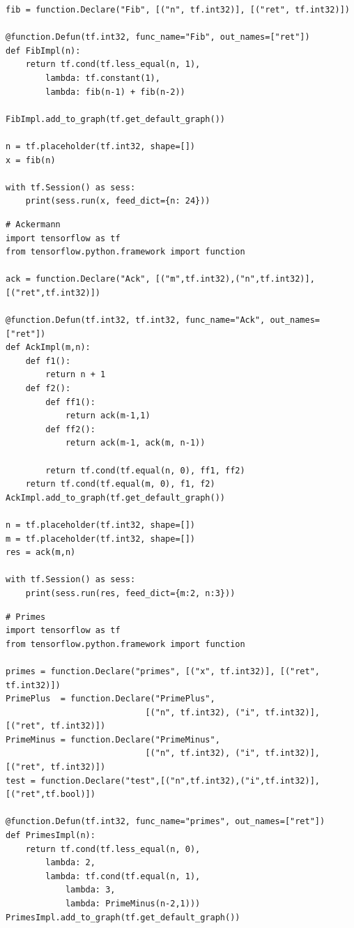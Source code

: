 \documentclass[ack,preface]{dithesis}
\begin{document}
\begin{appendix}
\begin{lstlisting}
fib = function.Declare("Fib", [("n", tf.int32)], [("ret", tf.int32)])

@function.Defun(tf.int32, func_name="Fib", out_names=["ret"])
def FibImpl(n):
	return tf.cond(tf.less_equal(n, 1),
		lambda: tf.constant(1),
		lambda: fib(n-1) + fib(n-2))

FibImpl.add_to_graph(tf.get_default_graph())

n = tf.placeholder(tf.int32, shape=[])
x = fib(n)

with tf.Session() as sess:
	print(sess.run(x, feed_dict={n: 24}))

\end{lstlisting}

\begin{lstlisting}
# Ackermann
import tensorflow as tf
from tensorflow.python.framework import function

ack = function.Declare("Ack", [("m",tf.int32),("n",tf.int32)],[("ret",tf.int32)])

@function.Defun(tf.int32, tf.int32, func_name="Ack", out_names=["ret"])
def AckImpl(m,n):
	def f1(): 
		return n + 1
	def f2():
		def ff1():
			return ack(m-1,1)
		def ff2():
			return ack(m-1, ack(m, n-1))

		return tf.cond(tf.equal(n, 0), ff1, ff2)
	return tf.cond(tf.equal(m, 0), f1, f2)
AckImpl.add_to_graph(tf.get_default_graph())

n = tf.placeholder(tf.int32, shape=[])
m = tf.placeholder(tf.int32, shape=[])
res = ack(m,n)

with tf.Session() as sess:
	print(sess.run(res, feed_dict={m:2, n:3}))
\end{lstlisting}

\begin{lstlisting}
# Primes
import tensorflow as tf
from tensorflow.python.framework import function

primes = function.Declare("primes", [("x", tf.int32)], [("ret", tf.int32)])
PrimePlus  = function.Declare("PrimePlus",  
							[("n", tf.int32), ("i", tf.int32)], [("ret", tf.int32)])
PrimeMinus = function.Declare("PrimeMinus", 
							[("n", tf.int32), ("i", tf.int32)], [("ret", tf.int32)])
test = function.Declare("test",[("n",tf.int32),("i",tf.int32)],[("ret",tf.bool)])

@function.Defun(tf.int32, func_name="primes", out_names=["ret"])
def PrimesImpl(n):
	return tf.cond(tf.less_equal(n, 0),
		lambda: 2,
		lambda: tf.cond(tf.equal(n, 1),
			lambda: 3,
			lambda: PrimeMinus(n-2,1)))
PrimesImpl.add_to_graph(tf.get_default_graph())


\end{lstlisting}
\end{appendix}
\end{document}
